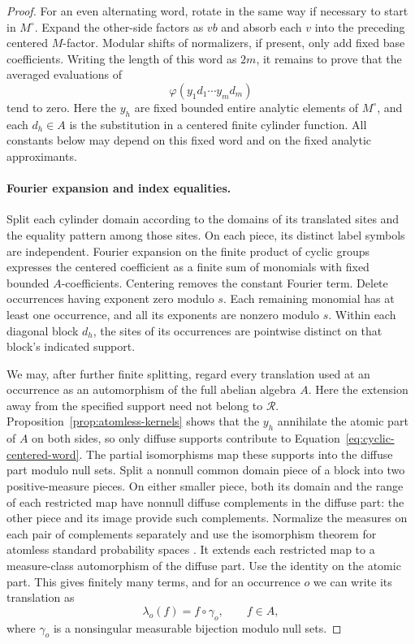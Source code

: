 \begin{proof}
For an even alternating word, rotate in the same way if necessary to
start in $M^\circ$. Expand the other-side factors as $vb$ and absorb
each $v$ into the preceding centered $M$-factor. Modular shifts of
normalizers, if present, only add fixed base coefficients. Writing the length of this word as $2m$, it remains
to prove that the averaged evaluations of
\begin{equation}
 \varphi(y_1d_1\cdots y_md_m)
 \label{eq:cyclic-centered-word}
\end{equation}
tend to zero. Here the $y_h$ are fixed bounded entire analytic elements
of $M^\circ$, and each $d_h\in A$ is the substitution in a centered
finite cylinder function. All constants below may depend on this fixed
word and on the fixed analytic approximants.

\paragraph{Fourier expansion and index equalities.}
Split each cylinder domain according to the domains of its translated
sites and the equality pattern among those sites. On each piece, its
distinct label symbols are independent. Fourier expansion on the finite
product of cyclic groups expresses the centered coefficient as a finite
sum of monomials with fixed bounded $A$-coefficients. Centering removes
the constant Fourier term. Delete occurrences having exponent zero
modulo $s$. Each remaining monomial has at least one occurrence, and
all its exponents are nonzero modulo $s$. Within each diagonal block
$d_h$, the sites of its occurrences are pointwise distinct on that
block's indicated support.

We may, after further finite splitting, regard every translation used
at an occurrence as an automorphism of the full abelian algebra $A$.
Here the extension away from the specified support need not belong to
$\mathcal R$. Proposition~\ref{prop:atomless-kernels} shows that the
$y_h$ annihilate the atomic part of $A$ on both sides, so only diffuse
supports contribute to Equation~\eqref{eq:cyclic-centered-word}.
The partial isomorphisms map these supports into the diffuse part
modulo null sets. Split a nonnull common domain piece of a block into
two positive-measure pieces. On either smaller piece, both its domain
and the range of each restricted map have nonnull diffuse complements
in the diffuse part: the other piece and its image provide such
complements. Normalize the measures on each pair of complements
separately and use the isomorphism theorem for atomless standard
probability spaces \cite[Theorem~17.41]{Kec95}. It extends each
restricted map to a measure-class automorphism of the diffuse part.
Use the identity on the atomic part. This gives finitely many terms,
and for an occurrence $o$ we can write its translation as
\[
 \lambda_o(f)=f\circ\gamma_o,\qquad f\in A,
\]
where $\gamma_o$ is a nonsingular measurable bijection modulo null sets.


\end{proof}
